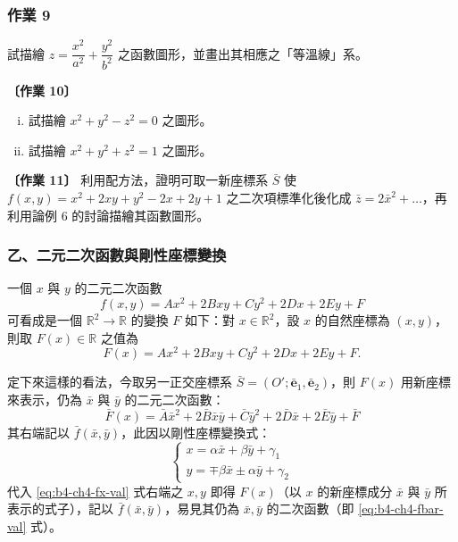 \subsubsection*{作業 9}
試描繪 $z = \dfrac{x^2}{a^2} + \dfrac{y^2}{b^2}$ 之函數圖形，並畫出其相應之「等溫線」系。

\textbf{〔作業 10〕}
\begin{enumerate}[(i)]
  \item 試描繪 $x^2 + y^2 - z^2 = 0$ 之圖形。
  \item 試描繪 $x^2 + y^2 + z^2 = 1$ 之圖形。
\end{enumerate}

\textbf{〔作業 11〕} 利用配方法，證明可取一新座標系 $\bar{S}$ 使 $f(x, y) = x^2 + 2xy + y^2 - 2x + 2y + 1$ 之二次項標準化後化成 $\bar{z} = 2\bar{x}^2 + \dots$，再利用論例 6 的討論描繪其函數圖形。

\subsubsection*{乙、\quad 二元二次函數與剛性座標變換}

一個 $x$ 與 $y$ 的二元二次函數
\begin{equation}
f(x, y) = Ax^2 + 2Bxy + Cy^2 + 2Dx + 2Ey + F
\label{eq:b4-ch4-func-fxy}
\end{equation}
可看成是一個 $\mathbb{R}^2 \to \mathbb{R}$ 的變換 $F$ 如下：對 $x \in \mathbb{R}^2$，設 $x$ 的自然座標為 $(x, y)$，則取 $F(x) \in \mathbb{R}$ 之值為
\begin{equation}
F(x) = Ax^2 + 2Bxy + Cy^2 + 2Dx + 2Ey + F.
\label{eq:b4-ch4-fx-val}
\end{equation}

定下來這樣的看法，今取另一正交座標系 $\bar{S} = (O'; \bar{\mathbf{e}}_1, \bar{\mathbf{e}}_2)$，則 $F(x)$ 用新座標來表示，仍為 $\bar{x}$ 與 $\bar{y}$ 的二元二次函數：
\begin{equation}
\bar{F}(x) = \bar{A}\bar{x}^2 + 2\bar{B}\bar{x}\bar{y} + \bar{C}\bar{y}^2 + 2\bar{D}\bar{x} + 2\bar{E}\bar{y} + \bar{F}
\label{eq:b4-ch4-fbar-val}
\end{equation}
其右端記以 $\bar{f}(\bar{x}, \bar{y})$，此因以剛性座標變換式：
\begin{equation}
\begin{cases}
x = \alpha \bar{x} + \beta \bar{y} + \gamma_1 \\
y = \mp \beta \bar{x} \pm \alpha \bar{y} + \gamma_2
\end{cases}
\label{eq:b4-ch4-rigid-coord-transform}
\end{equation}
代入 \eqref{eq:b4-ch4-fx-val} 式右端之 $x, y$ 即得 $F(x)$（以 $x$ 的新座標成分 $\bar{x}$ 與 $\bar{y}$ 所表示的式子），記以 $\bar{f}(\bar{x}, \bar{y})$，易見其仍為 $\bar{x}, \bar{y}$ 的二次函數（即 \eqref{eq:b4-ch4-fbar-val} 式）。

